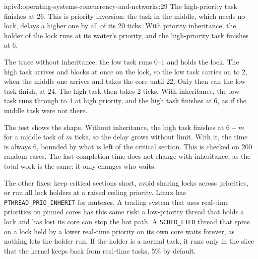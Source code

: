 \begin{solution}{iq:iv3:operating-systems-concurrency-and-networks:29}
The high-priority task finishes at 26. This is priority inversion: the task in the middle, which needs no lock, delays a higher one by all of its 20 ticks. With priority inheritance, the holder of the lock runs at its waiter's priority, and the high-priority task finishes at 6.
\label{lst:iv3:os:inversion}

The trace without inheritance: the low task runs 0--1 and holds the lock. The high task arrives and blocks at once on the lock, so the low task carries on to 2, when the middle one arrives and takes the core until 22. Only then can the low task finish, at 24. The high task then takes 2 ticks. With inheritance, the low task runs through to 4 at high priority, and the high task finishes at 6, as if the middle task were not there.

The test shows the shape. Without inheritance, the high task finishes at $6 + m$ for a middle task of $m$ ticks, so the delay grows without limit. With it, the time is always 6, bounded by what is left of the critical section. This is checked on 200 random cases. The last completion time does not change with inheritance, as the total work is the same: it only changes who waits.

The other fixes: keep critical sections short, avoid sharing locks across priorities, or run all lock holders at a raised ceiling priority. Linux has \texttt{PTHREAD\_PRIO\_INHERIT} for mutexes. A trading system that uses real-time priorities on pinned cores has this same risk: a low-priority thread that holds a lock and has lost its core can stop the hot path. A \texttt{SCHED\_FIFO} thread that spins on a lock held by a lower real-time priority on its own core waits forever, as nothing lets the holder run. If the holder is a normal task, it runs only in the slice that the kernel keeps back from real-time tasks, 5\% by default.

\end{solution}

